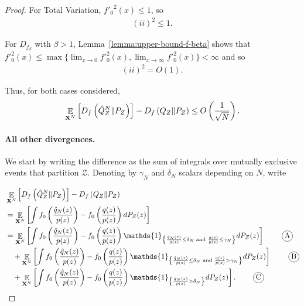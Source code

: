 \begin{proof}
For Total Variation, ${f'_0}^2(x) \leq 1$, so
\begin{align*}
    (ii)^2 \leq 1.
\end{align*}

For $D_{f_\beta}$ with $\beta>1$, Lemma~\ref{lemma:upper-bound-f-beta} shows that $f'^2_0(x) \leq \max\{\lim_{x\to 0}f'^2_0(x), \lim_{x\to \infty}f'^2_0(x)\} < \infty$ and so 
\begin{align*}
    (ii)^2 = O(1).
\end{align*}

Thus, for both cases considered,
\begin{align*}
    \mathop{\mathbb{E}}_{\mathbf{X}^N} \left[ D_f\left( \hat{Q}_Z^N \| P_Z\right)\right] - D_f\left( Q_{Z} \| P_Z\right) \leq O\left( \frac{1}{\sqrt{N}} \right).
\end{align*}

\paragraph{All other divergences.}

We start by writing the difference as the sum of integrals over mutually exclusive events that partition $\mathcal{Z}$.
Denoting by $\gamma_N$ and $\delta_N$ scalars depending on $N$, write

\begin{align*}
    & \E_{\XN} \left[ D_f\left( \hat{Q}_Z^N \| P_Z\right)\right] - D_f\left( Q_{Z} \| P_Z\right)  \\
    &= \E_{\XN} \left[\int f_0\left( \frac{\hat{q}_N(z)}{p(z)} \right) - f_0\left( \frac{q(z)}{p(z)} \right) dP_Z(z) \right] \\
    &= \E_{\XN} \left[ \int f_0\left( \frac{\hat{q}_N(z)}{p(z)} \right) - f_0\left( \frac{q(z)}{p(z)} \right) \mathds{1}_{\left\lbrace \frac{\hat{q}_N(z)}{p(z)} \leq \delta_N \text{ and } \frac{q(z)}{p(z)} \leq \gamma_N \right\rbrace} dP_Z(z) \right] \tag*{\encircle{A}}\\
    & \quad + \E_{\XN} \left[\int f_0\left( \frac{\hat{q}_N(z)}{p(z)} \right) - f_0\left( \frac{q(z)}{p(z)} \right) \mathds{1}_{\left\lbrace \frac{\hat{q}_N(z)}{p(z)} \leq \delta_N \text{ and } \frac{q(z)}{p(z)} > \gamma_N \right\rbrace} dP_Z(z) \right]\tag*{\encircle{B}}\\
    & \quad + \E_{\XN} \left[ \int f_0\left( \frac{\hat{q}_N(z)}{p(z)} \right) - f_0\left( \frac{q(z)}{p(z)} \right) \mathds{1}_{\left\lbrace \frac{\hat{q}_N(z)}{p(z)} > \delta_N \right\rbrace} dP_Z(z) \right]. \tag*{\encircle{C}}
\end{align*}


\end{proof}
